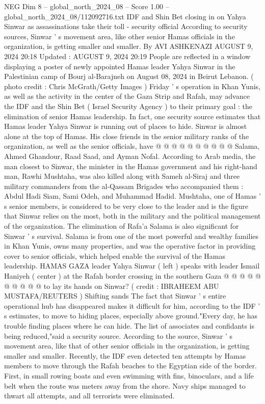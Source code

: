 \begin{textsample}{NEG Dim 8 – global\_north\_2024\_08 – Score 1.00 – global\_north\_2024\_08/112092716.txt}  \label{ex:f8_neg_426}
IDF and Shin Bet closing in on Yahya Sinwar as assassinations take their toll - security official According to security sources, Sinwar ' s movement area, like other senior Hamas officials in the organization, is getting smaller and smaller.
By AVI ASHKENAZI AUGUST 9, 2024 20:18 Updated : AUGUST 9, 2024 20:19 People are reflected in a window displaying a poster of newly appointed Hamas leader Yahya Sinwar in the Palestinian camp of Bourj al-Barajneh on August 08, 2024 in Beirut Lebanon. ( photo credit : Chris McGrath/Getty Images ) Friday ' s operation in Khan Yunis, as well as the activity in the center of the Gaza Strip and Rafah, may advance the IDF and the Shin Bet ( Israel Security Agency ) to their primary goal : the elimination of senior Hamas leadership.
In fact, one security source estimates that Hamas leader Yahya Sinwar is running out of places to hide.
Sinwar is almost alone at the top of Hamas.
His close friends in the senior military ranks of the organization, as well as the senior officials, have @ @ @ @ @ @ @ @ @ @ Salama, Ahmed Ghandour, Raad Saad, and Ayman Nofal.
According to Arab media, the man closest to Sinwar, the minister in the Hamas government and his right-hand man, Rawhi Mushtaha, was also killed along with Sameh al-Siraj and three military commanders from the al-Qassam Brigades who accompanied them : Abdul Hadi Siam, Sami Odeh, and Muhammad Hadid.
Mushtaha, one of Hamas ' s senior members, is considered to be very close to the leader and is the figure that Sinwar relies on the most, both in the military and the political management of the organization.
The elimination of Rafa'a Salama is also significant for Sinwar ' s survival.
Salama is from one of the most powerful and wealthy families in Khan Yunis, owns many properties, and was the operative factor in providing cover to senior officials, which helped enable the survival of the Hamas leadership.
HAMAS GAZA leader Yahya Sinwar ( left ) speaks with leader Ismail Haniyeh ( center ) at the Rafah border crossing in the southern Gaza @ @ @ @ @ @ @ @ @ @ to lay its hands on Sinwar? ( credit : IBRAHEEM ABU MUSTAFA/REUTERS ) Shifting sands The fact that Sinwar ' s entire operational hub has disappeared makes it difficult for him, according to the IDF ' s estimates, to move to hiding places, especially above ground."Every day, he has trouble finding places where he can hide.
The list of associates and confidants is being reduced,"said a security source.
According to the source, Sinwar ' s movement area, like that of other senior officials in the organization, is getting smaller and smaller.
Recently, the IDF even detected ten attempts by Hamas members to move through the Rafah beaches to the Egyptian side of the border.
First, in small rowing boats and even swimming with fins, binoculars, and a life belt when the route was meters away from the shore.
Navy ships managed to thwart all attempts, and all terrorists were eliminated.

\end{textsample}
